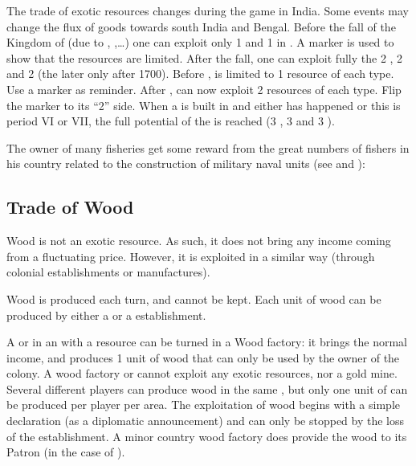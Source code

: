 \label{chIncomes:TradeIndia}
The trade of exotic resources changes during the game in India. Some events
may change the flux of goods towards south India and Bengal.
\bparag Before the fall of the Kingdom of  (due to
, ,\ldots) one
can exploit only 1  and 1  in
. A marker is used to show that the resources are
limited.
\bparag After the fall, one can exploit fully the 2 ,
2  and 2  (the later only after 1700).
\bparag Before ,  is limited
to 1 resource of each type. Use a marker as reminder.
\bparag After ,  can now
exploit 2 resources of each type. Flip the marker to its ``2'' side.
\bparag When a \COL is built in  and either
 has happened or this is period VI or VII, the
full potential of the \Area is reached (3 , 3
 and 3 ).

 The owner of many fisheries get some
reward from the great numbers of fishers in his country related to the
construction of military naval units (see  and ):



\subsection{Trade of Wood}\label{chIncomes:Wood}

\aparag Wood is not an exotic resource. As such, it does not bring any income
coming from a fluctuating price. However, it is exploited in a similar way
(through colonial establishments or manufactures).

 Wood is produced each turn, and cannot be kept. Each
unit of wood can be produced by either a \MNU or a \ROTW establishment.

 A \COL\faceplus or \TP\faceplus in an \Area with a
 resource can be turned in a Wood factory: it brings the normal
income, and produces 1 unit of wood that can only be used by the owner of the
colony.
\bparag A wood factory \TP or \COL cannot exploit any exotic resources, nor a
gold mine. Several different players can produce wood in the same \Area, but
only one unit of  can be produced per player per area.
\bparag The exploitation of wood begins with a simple declaration (as a
diplomatic announcement) and can only be stopped by the loss of the
establishment.
\bparag A minor country wood factory does provide the wood to its Patron (in
the case of ).

